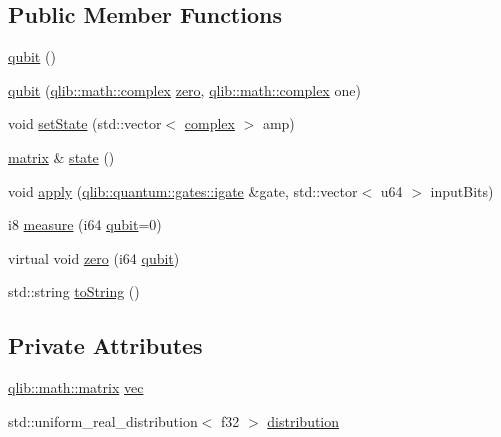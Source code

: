 \subsection*{Public Member Functions}
\begin{DoxyCompactItemize}
\item 
\hyperlink{classqlib_1_1quantum_1_1qubit_a32ca47a6fca663c267ddbbac49b12986}{qubit} ()
\item 
\hyperlink{classqlib_1_1quantum_1_1qubit_a9c84248c8855841087687baa8b0a08c3}{qubit} (\hyperlink{classqlib_1_1math_1_1complex}{qlib\+::math\+::complex} \hyperlink{classqlib_1_1quantum_1_1qubit_aa16b11ad849b672489c625196c800dd3}{zero}, \hyperlink{classqlib_1_1math_1_1complex}{qlib\+::math\+::complex} one)
\item 
void \hyperlink{classqlib_1_1quantum_1_1qubit_a934b5ff2dfbcc22ec2aab4e3a6544b6f}{set\+State} (std\+::vector$<$ \hyperlink{classqlib_1_1math_1_1complex}{complex} $>$ amp)
\item 
\hyperlink{classqlib_1_1math_1_1matrix}{matrix} \& \hyperlink{classqlib_1_1quantum_1_1qubit_af8eaf337ffcb95c2445ddf35189335e4}{state} ()
\item 
void \hyperlink{classqlib_1_1quantum_1_1qubit_ab3b0b76d5c6f0e627a742fcafbc768ae}{apply} (\hyperlink{classqlib_1_1quantum_1_1gates_1_1igate}{qlib\+::quantum\+::gates\+::igate} \&gate, std\+::vector$<$ u64 $>$ input\+Bits)
\item 
i8 \hyperlink{classqlib_1_1quantum_1_1qubit_aaf001eff84ccb4b7a6992e42bc2143cb}{measure} (i64 \hyperlink{classqlib_1_1quantum_1_1qubit}{qubit}=0)
\item 
virtual void \hyperlink{classqlib_1_1quantum_1_1qubit_aa16b11ad849b672489c625196c800dd3}{zero} (i64 \hyperlink{classqlib_1_1quantum_1_1qubit}{qubit})
\item 
std\+::string \hyperlink{classqlib_1_1quantum_1_1qubit_a8bf29d1f66508e4878ea861c5d8e44ec}{to\+String} ()
\end{DoxyCompactItemize}
\subsection*{Private Attributes}
\begin{DoxyCompactItemize}
\item 
\hyperlink{classqlib_1_1math_1_1matrix}{qlib\+::math\+::matrix} \hyperlink{classqlib_1_1quantum_1_1qubit_a8f6e33dd5d0673f195360bc4b5c5442f}{vec}
\item 
std\+::uniform\+\_\+real\+\_\+distribution$<$ f32 $>$ \hyperlink{classqlib_1_1quantum_1_1qubit_abb97216eead736ab87e8756b9b4c2ce9}{distribution}
\end{DoxyCompactItemize}


